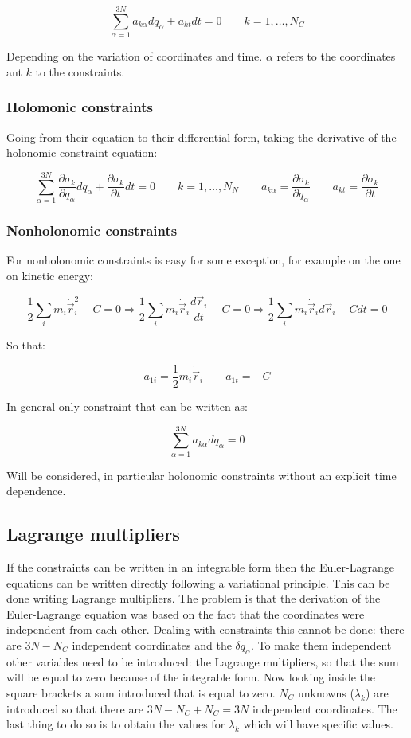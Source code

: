 	$$\sum\limits_{\alpha = 1}^{3N} a_{k\alpha}dq_\alpha + a_{kt}dt = 0\qquad k = 1, \dots, N_C$$

	Depending on the variation of coordinates and time.
	$\alpha$ refers to the coordinates ant $k$ to the constraints.

		\subsubsection{Holomonic constraints}
		Going from their equation to their differential form, taking the derivative of the holonomic constraint equation:

		$$\sum\limits_{\alpha=1}^{3N}\frac{\partial\sigma_k}{\partial q_\alpha}dq_\alpha + \frac{\partial\sigma_k}{\partial t} dt = 0\qquad k = 1, \dots, N_N\qquad a_{k\alpha} = \frac{\partial\sigma_k}{\partial q_\alpha}\qquad a _{kt} = \frac{\partial\sigma_k}{\partial t}$$

		\subsubsection{Nonholonomic constraints}
		For nonholonomic constraints is easy for some exception, for example on the one on kinetic energy:

		$$\frac{1}{2}\sum\limits_i m_i\dot{\vec{r}}_i^2 - C = 0\Rightarrow\frac{1}{2}\sum\limits_i m_i\dot{\vec{r}}_i\frac{d\vec{r}_i}{dt} - C = 0\Rightarrow\frac{1}{2}\sum\limits_i m_i\dot{\vec{r}}_id\vec{r}_i-Cdt = 0$$

		So that:

		$$a_{1i}=\frac{1}{2}m_i\dot{\vec{r}}_i\qquad a_{1t} = -C$$

		In general only constraint that can be written as:

		$$\sum\limits_{\alpha=1}^{3N}a_{k\alpha}dq_\alpha=0$$

		Will be considered, in particular holonomic constraints without an explicit time dependence.

	\subsection{Lagrange multipliers}
	If the constraints can be written in an integrable form then the Euler-Lagrange equations can be written directly following a variational principle.
	This can be done writing Lagrange multipliers.
	The problem is that the derivation of the Euler-Lagrange equation was based on the fact that the coordinates were independent from each other.
	Dealing with constraints this cannot be done: there are $3N-N_C$ independent coordinates and the $\delta q_\alpha$.
	To make them independent other variables need to be introduced: the Lagrange multipliers, so that the sum will be equal to zero because of the integrable form.
	Now looking inside the square brackets a sum introduced that is equal to zero.
	$N_C$ unknowns ($\lambda_k$) are introduced so that there are $3N-N_C+N_C=3N$ independent coordinates.
	The last thing to do so is to obtain the values for $\lambda_k$ which will have specific values.

